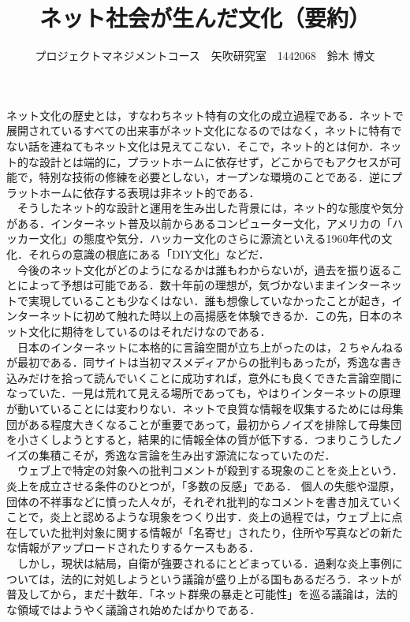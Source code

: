 \documentclass[uplatex,twocolumn,dvipdfmx]{jsarticle}
\title{\vspace{-5mm}\fontsize{14pt}{0pt}\selectfont ネット社会が生んだ文化（要約）}
\author{\normalsize プロジェクトマネジメントコース　矢吹研究室　1442068　鈴木 博文}
\date{}
\begin{document}
\fontsize{10.5pt}{\baselineskip}\selectfont
\maketitle

ネット文化の歴史とは，すなわちネット特有の文化の成立過程である．ネットで展開されているすべての出来事がネット文化になるのではなく，ネットに特有でない話を連ねてもネット文化は見えてこない．そこで，ネット的とは何か．ネット的な設計とは端的に，プラットホームに依存せず，どこからでもアクセスが可能で，特別な技術の修練を必要としない，オープンな環境のことである．逆にプラットホームに依存する表現は非ネット的である．
\\　そうしたネット的な設計と運用を生み出した背景には，ネット的な態度や気分がある．インターネット普及以前からあるコンピューター文化，アメリカの「ハッカー文化」の態度や気分．ハッカー文化のさらに源流といえる1960年代の文化．それらの意識の根底にある「DIY文化」などだ．
\\　今後のネット文化がどのようになるかは誰もわからないが，過去を振り返ることによって予想は可能である．数十年前の理想が，気づかないままインターネットで実現していることも少なくはない．誰も想像していなかったことが起き，インターネットに初めて触れた時以上の高揚感を体験できるか．この先，日本のネット文化に期待をしているのはそれだけなのである．
\\　日本のインターネットに本格的に言論空間が立ち上がったのは，２ちゃんねるが最初である．同サイトは当初マスメディアからの批判もあったが，秀逸な書き込みだけを拾って読んでいくことに成功すれば，意外にも良くできた言論空間になっていた．一見は荒れて見える場所であっても，やはりインターネットの原理が動いていることには変わりない．ネットで良質な情報を収集するためには母集団がある程度大きくなることが重要であって，最初からノイズを排除して母集団を小さくしようとすると，結果的に情報全体の質が低下する．つまりこうしたノイズの集積こそが，秀逸な言論を生み出す源流になっていたのだ．
\\　ウェブ上で特定の対象への批判コメントが殺到する現象のことを炎上という．炎上を成立させる条件のひとつが，「多数の反感」である．
個人の失態や湿原，団体の不祥事などに憤った人々が，それぞれ批判的なコメントを書き加えていくことで，炎上と認めるような現象をつくり出す．炎上の過程では，ウェブ上に点在していた批判対象に関する情報が「名寄せ」されたり，住所や写真などの新たな情報がアップロードされたりするケースもある．
\\　しかし，現状は結局，自衛が強要されるにとどまっている．過剰な炎上事例については，法的に対処しようという議論が盛り上がる国もあるだろう．ネットが普及してから，まだ十数年．「ネット群衆の暴走と可能性」を巡る議論は，法的な領域ではようやく議論され始めたばかりである．
\end{document}
